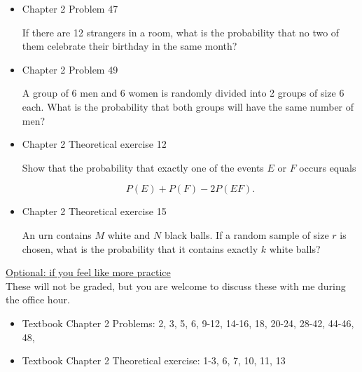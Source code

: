 \documentclass[11pt]{article}
\begin{document}
\begin{itemize}
    \item
    Chapter 2 Problem  47
    
    If there are 12 strangers in a room, what is the probability that no two of them celebrate their birthday in the same month?

    \item
    Chapter 2 Problem  49
    
    A group of 6 men and 6 women is randomly divided into 2 groups of size 6 each. What is the probability that both groups will have the same number of men?


    \item
    Chapter 2 Theoretical exercise 12
    
    Show that the probability that exactly one of the events $E$ or $F$ occurs equals 
    
    $$
    P(E) + P(F) - 2P(EF).
    $$

    \item
    Chapter 2 Theoretical exercise 15
    
    An urn contains $M$ white and $N$ black balls. If a random sample of size $r$ is chosen, what is the probability that it contains exactly $k$ white balls?



\end{itemize}


\vspace{12pt}

\underline{Optional: if you feel like more practice}\\
These will not be graded, but you are welcome to discuss these with me during the office hour.

\begin{itemize}


\item Textbook  Chapter 2 Problems: 2, 3, 5, 6, 9-12, 14-16, 18, 20-24, 28-42, 44-46, 48,
\item Textbook  Chapter 2 Theoretical exercise: 1-3, 6, 7, 10, 11, 13

\end{itemize}
\end{document}
